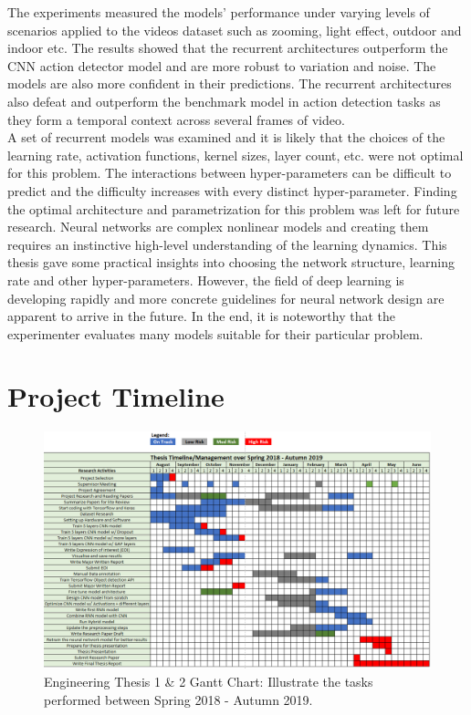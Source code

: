 The experiments measured the models’ performance under varying levels of scenarios applied to the videos dataset such as zooming, light effect, outdoor and indoor etc. The results showed that the recurrent architectures outperform the CNN action detector model and are more robust to variation and noise. The models are also more confident in their predictions. The recurrent architectures also defeat and outperform the benchmark model in action detection tasks as they form a temporal context across several frames of video.\\

A set of recurrent models was examined and it is likely that the choices of the learning rate, activation functions, kernel sizes, layer count, etc. were not optimal for this problem. The interactions between hyper-parameters can be difficult to predict and the difficulty increases with every distinct hyper-parameter. Finding the optimal architecture and parametrization for this problem was left for future research. Neural networks are complex nonlinear models and creating them requires an instinctive high-level understanding of the learning dynamics. This thesis gave some practical insights into choosing the network structure, learning rate and other hyper-parameters. However, the field of deep learning is developing rapidly and more concrete guidelines for neural network design are apparent to arrive in the future. In the end, it is noteworthy that the experimenter evaluates many models suitable for their particular problem.\\




\chapter{Project Timeline}

\begin{figure}[ht]
\centering

\includegraphics[angle=90,origin=c,width=0.7\columnwidth]{Figures/Project_Timeline.PNG}
\decoRule
\caption[Engineering Thesis 1 \& 2 Gantt Chart: Illustrate the tasks performed between Spring 2018 - Autumn 2019.]{Engineering Thesis 1 \& 2 Gantt Chart: Illustrate the tasks performed between Spring 2018 - Autumn 2019.}
\label{fig:missclassified1}
\end{figure}

